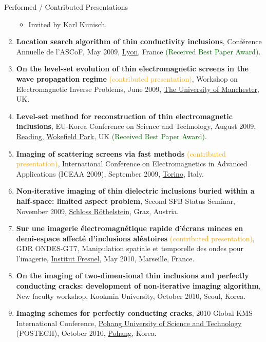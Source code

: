 \documentclass{resume} %
\begin{document}
\begin{rSection}{Performed / Contributed Presentations}
\begin{enumerate}
\begin{itemize}
\item Invited by Karl Kunisch.
\end{itemize}
\item\label{P-ASCOF2009} \textbf{Location search algorithm of thin conductivity inclusions}, Conf{\'e}rence Annuelle de l'ASCoF, May 2009, \href{https://www.lyon.fr}{Lyon}, France \textcolor{darkgreen}{(Received Best Paper Award)}.
\item\label{P-MANCHESTER2009} \textbf{On the level-set evolution of thin electromagnetic screens in the wave propagation regime} \textcolor{orange}{(contributed presentation)}, Workshop on Electromagnetic Inverse Problems, June 2009, \href{https://www.manchester.ac.uk}{The University of Manchester}, UK.
\item\label{P-EKC2009} \textbf{Level-set method for reconstruction of thin electromagnetic inclusions}, EU-Korea Conference on Science and Technology, August 2009, \href{https://www.visit-reading.com}{Reading}, \href{https://www.devere.co.uk/wokefield-estate/}{Wokefield Park}, UK \textcolor{darkgreen}{(Received Best Paper Award)}.
\item\label{P-ICEAA2009} \textbf{Imaging of scattering screens via fast methods} \textcolor{orange}{(contributed presentation)}, International Conference on Electromagnetics in Advanced Applications (ICEAA 2009), September 2009, \href{http://www.turinitalyguide.com}{Torino}, Italy.
\item\label{P-SFB2009} \textbf{Non-iterative imaging of thin dielectric inclusions buried within a half-space: limited aspect problem}, Second SFB Status Seminar, November 2009, \href{http://www.jufa.at/roethelstein.php}{Schloss R\"othelstein}, Graz, Austria.
\item\label{P-GDR2010} \textbf{Sur une imagerie \'electromagn\'etique rapide d'\'ecrans minces en demi-espace affect\'e d'inclusions al\'eatoires} \textcolor{orange}{(contributed presentation)}, GDR ONDES-GT7, Manipulation spatiale et temporelle des ondes pour l'imagerie, \href{https://www.fresnel.fr/}{Institut Fresnel}, May 2010, Marseille, France.
\item\label{P-KMU2010} \textbf{On the imaging of two-dimensional thin inclusions and perfectly conducting cracks: development of non-iterative imaging algorithm}, New faculty workshop, Kookmin University, October 2010, Seoul, Korea.
\item\label{P-KMS2010} \textbf{Imaging schemes for perfectly conducting cracks}, 2010 Global KMS International Conference, \href{https://postech.ac.kr}{Pohang University of Science and Technology} (POSTECH), October 2010, \href{https://www.pohang.go.kr/intro.html}{Pohang}, Korea.

\end{enumerate}
\end{rSection}
\end{document}
